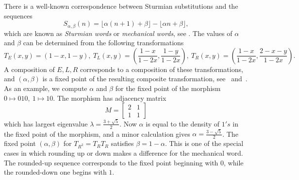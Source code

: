 \documentclass[12pt,reqno]{article}
\begin{document}
There is a well-known correspondence between Sturmian substitutions and the sequences
\[
S_{\alpha,\beta}(n)=\lfloor \alpha (n+1) +\beta\rfloor - \lfloor \alpha n+\beta\rfloor,
\]
which are known as \emph{Sturmian words} or \emph{mechanical words}, see \cite[p53]{Berstel}.
The values of $\alpha$ and $\beta$ can be determined from the following transformations
\[
T_E(x,y)=\left(1-x,1-y\right),\ 
T_L(x,y)=\left(\frac{1-x}{1-2x},\frac{1-y}{1-2x} \right),\ 
T_R(x,y)=\left(\frac{1-x}{1-2x},\frac{2-x-y}{1-2x} \right).
\]
A composition of $E,L,R$ corresponds to a composition of these
transformations, and $(\alpha,\beta)$ is a fixed point of the resulting composite transformation, 
see~\cite[p73]{Berstel} and~\cite{bosma2018}.
As an example, we compute $\alpha$
and $\beta$ for the fixed point of the morphism $0\mapsto 010,\ 1\mapsto 10$.
The morphism has adjacency matrix
\[
M = \begin{bmatrix}
2 & 1 \\
1 & 1
\end{bmatrix}
\]
which has largest eigenvalue $\lambda=\frac{3+\sqrt 5}2$. 
Now $\alpha$ is equal to the density   
of $1's$ in the fixed point of the morphism,
and a minor calculation gives $\alpha=\frac{3-\sqrt{5}}2$.
The fixed point $(\alpha,\beta)$ for $T_{R^2}=T_RT_R$ satisfies $\beta=1-\alpha$.
This is one of the special cases in which rounding up or down makes a difference
for the mechanical word. The
rounded-up sequence
corresponds to the fixed point beginning with $0$, while the rounded-down one
begins with $1$. 
\end{document}
